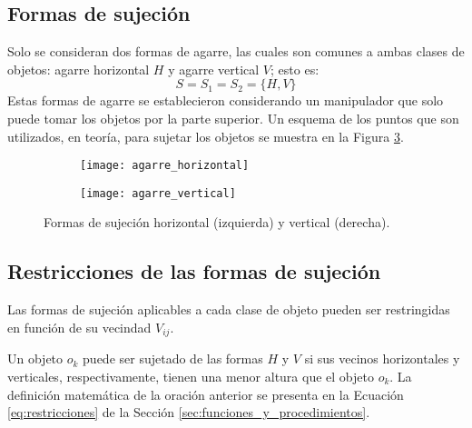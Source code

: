 \subsection{Formas de sujeción}
\label{subsec:formas_sujecion}
%
%
Solo se consideran dos formas de agarre, las cuales son comunes a ambas clases de objetos: agarre horizontal $H$ y agarre vertical $V$; esto es:
%
\begin{equation}
\label{eq:formas_sujecion_usadas}
	S = S_1 = S_2 = \{H, V\}
\end{equation}
%
Estas formas de agarre se establecieron considerando un manipulador que solo puede tomar los objetos por la parte superior.
Un esquema de los puntos que son utilizados, en teoría, para sujetar los objetos se muestra en la Figura \ref{fig:formas_sujecion}.
%
\begin{figure}[H]
	\begin{subfigure}{0.4\textwidth}
		\texttt{[image: agarre\_horizontal]}%
		\label{subfig:sujecion_H}%
	\end{subfigure}%
	\hspace{1cm}
	\begin{subfigure}{0.4\textwidth}
		\texttt{[image: agarre\_vertical]}%
		\label{subfig:sujecion_V}%
	\end{subfigure}%
	\caption{Formas de sujeción horizontal (izquierda) y vertical (derecha).}%
	\label{fig:formas_sujecion}%
\end{figure}
%
%
\subsection{Restricciones de las formas de sujeción}
\label{subsec:restricciones}
%
%
Las formas de sujeción aplicables a cada clase de objeto pueden ser restringidas en función de su vecindad $V_{ij}$.

Un objeto $o_k$ puede ser sujetado de las formas $H$ y $V$ si sus vecinos horizontales y verticales, respectivamente, tienen una menor altura que el objeto $o_k$.
La definición matemática de la oración anterior se presenta en la Ecuación \ref{eq:restricciones} de la Sección \ref{sec:funciones_y_procedimientos}.

